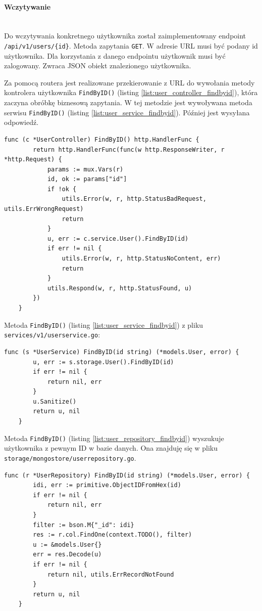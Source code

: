 % 
\paragraph{Wczytywanie}\mbox{}\\
Do wczytywania konkretnego użytkownika został zaimplementowany endpoint \texttt{/api/v1/users/\{id\}}.
Metoda zapytania \texttt{GET}.
W adresie URL musi być podany id użytkownika.
Dla korzystania z danego endpointu użytkownik musi być zalogowany.
Zwraca JSON obiekt znalezionego użytkownika.

Za pomocą routera jest realizowane przekierowanie z URL do wywołania metody kontrolera użytkownika \texttt{FindByID()} (listing \ref{list:user_controller_findbyid}), która zaczyna obróbkę biznesową zapytania.
W tej metodzie jest wywoływana metoda serwisu \texttt{FindByID()} (listing \ref{list:user_service_findbyid}). Później jest wysyłana odpowiedź.
\begin{lstlisting}[label=list:user_controller_findbyid,caption=Kontroler wczytywania użytkownika.,basicstyle=\tiny\ttfamily]
    func (c *UserController) FindByID() http.HandlerFunc {
        return http.HandlerFunc(func(w http.ResponseWriter, r *http.Request) {
            params := mux.Vars(r)
            id, ok := params["id"]
            if !ok {
                utils.Error(w, r, http.StatusBadRequest, utils.ErrWrongRequest)
                return
            }
            u, err := c.service.User().FindByID(id)
            if err != nil {
                utils.Error(w, r, http.StatusNoContent, err)
                return
            }
            utils.Respond(w, r, http.StatusFound, u)
        })
    }
\end{lstlisting}
% 
Metoda \texttt{FindByID()} (listing \ref{list:user_service_findbyid}) z pliku \texttt{services/v1/userservice.go}:
\begin{lstlisting}[label=list:user_service_findbyid,caption=Serwis wczytywania użytkownika.,basicstyle=\tiny\ttfamily]
    func (s *UserService) FindByID(id string) (*models.User, error) {
        u, err := s.storage.User().FindByID(id)
        if err != nil {
            return nil, err
        }
        u.Sanitize()
        return u, nil
    }
\end{lstlisting}
% 
Metoda \texttt{FindByID()} (listing \ref{list:user_repository_findbyid}) wyszukuje użytkownika z pewnym ID w bazie danych.
Ona znajduję się w pliku \texttt{storage/mongostore/userrepository.go}.
\begin{lstlisting}[label=list:user_repository_findbyid,caption=Wczytywanie uzytkownika z bazy danych.,basicstyle=\tiny\ttfamily]
    func (r *UserRepository) FindByID(id string) (*models.User, error) {
        idi, err := primitive.ObjectIDFromHex(id)
        if err != nil {
            return nil, err
        }
        filter := bson.M{"_id": idi}
        res := r.col.FindOne(context.TODO(), filter)
        u := &models.User{}
        err = res.Decode(u)
        if err != nil {
            return nil, utils.ErrRecordNotFound
        }
        return u, nil
    }
\end{lstlisting}

